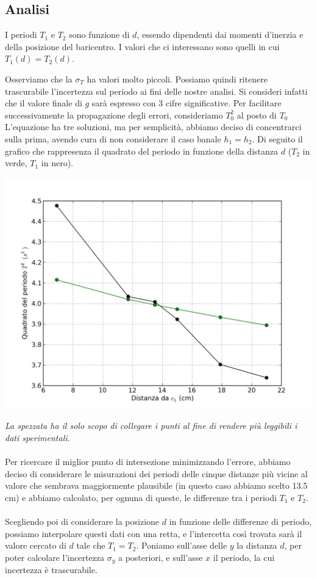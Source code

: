 \subsection{Analisi}
I periodi $T_1$ e $T_2$ sono funzione di $d$, essendo dipendenti dai momenti d'inerzia e della posizione del baricentro. I valori che ci interessano sono quelli in cui $T_1(d) = T_2(d)$.

Osserviamo che la $\sigma_T$ ha valori molto piccoli. Possiamo quindi ritenere trascurabile l'incertezza sul periodo ai fini delle nostre analisi. Si consideri infatti che il valore finale di $g$ sarà espresso con 3 cifre significative. Per facilitare successivamente la propagazione degli errori, consideriamo $T^2_{0}$ al posto di $T_0$
\\

L'equazione ha tre soluzioni, ma per semplicità, abbiamo deciso di concentrarci sulla prima, avendo cura di non considerare il caso banale $h_1=h_2$. Di seguito il grafico che rappresenza il quadrato del periodo in funzione della distanza $d$ ($T_2$ in verde, $T_1$ in nero).


\begin{center}
\includegraphics[scale=0.60]{../grafici/kater/kater-punti-raw.png}
\end{center}

\textit{La spezzata ha il solo scopo di collegare i punti al fine di rendere più leggibili i dati sperimentali.}\\
\\
Per ricercare il miglior punto di intersezione minimizzando l'errore, abbiamo deciso di considerare le misurazioni dei periodi delle cinque distanze più vicine al valore che sembrava maggiormente plausibile (in questo caso abbiamo scelto 13.5 cm) e abbiamo calcolato, per ognuna di queste, le differenze tra i periodi $T_1$ e $T_2$.\\
\\
Scegliendo poi di considerare la posizione $d$ in funzione delle differenze di periodo, possiamo interpolare questi dati con una retta, e l'intercetta così trovata sarà il valore cercato di $d$ tale che $T_1 = T_2$. Poniamo sull'asse delle $y$ la distanza $d$, per poter calcolare l'incertezza $\sigma_y$ a posteriori, e sull'asse $x$ il periodo, la cui incertezza è trascurabile. 

